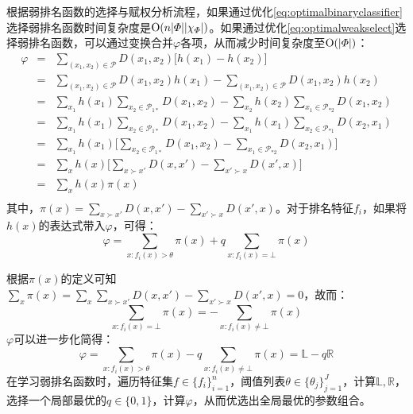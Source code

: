 根据弱排名函数的选择与赋权分析流程，如果通过优化\eqref{eq:optimalbinaryclassifier}选择弱排名函数时间复杂度是$\operatorname{\mathrm{O}}(n|\varPhi||\chi_{\varPhi}|)$。如果通过优化\eqref{eq:optimalweakselect}选择弱排名函数，可以通过变换合并$\varphi$各项，从而减少时间复杂度至$\operatorname{\mathrm{O}}(|\varPhi|)$：
\begin{equation}
    \begin{array}{lllc}
      \varphi & = & \sum\limits_{(x_1,x_2)\in \mathscr P} D(x_1,x_2) \big[h(x_1) - h(x_2)\big] \\
       & = & \sum\limits_{(x_1,x_2)\in \mathscr P} D(x_1,x_2) h(x_1) - \sum\limits_{(x_1,x_2)\in \mathscr P} D(x_1,x_2) h(x_2) \\
       & = & \sum\limits_{x_1} h(x_1) \sum\limits_{x_2\in \mathscr P_{1*}} D(x_1,x_2) -  \sum\limits_{x_2} h(x_2) \sum\limits_{x_1\in \mathscr P_{*2}} D(x_1,x_2) \\
       & = & \sum\limits_{x_1} h(x_1) \sum\limits_{x_2\in \mathscr P_{1*}} D(x_1,x_2) -  \sum\limits_{x_1} h(x_1) \sum\limits_{x_2\in \mathscr P_{*1}} D(x_2,x_1) \\
       & = & \sum\limits_{x_1} h(x_1) \big[\sum\limits_{x_2\in \mathscr P_{1*}} D(x_1,x_2) - \sum\limits_{x_1\in \mathscr P_{*2}} D(x_2,x_1)\big]\\
       & = & \sum\limits_{x} h(x) \big[\sum\limits_{x\succ x'} D(x,x') - \sum\limits_{x'\succ x} D(x',x)\big]\\
       & = & \sum\limits_{x} h(x) \pi(x)\\
    \end{array}
\end{equation}
其中，$\pi(x) = \sum\limits_{x\succ x'} D(x,x') - \sum\limits_{x'\succ x} D(x',x)$。对于排名特征$f_i$，如果将$h(x)$的表达式带入$\varphi$，可得：
\begin{equation}
    \varphi = \sum\limits_{x:f_i(x)> \theta} \pi(x) + q \sum\limits_{x:f_i(x)= \bot} \pi(x)
\end{equation}

根据$\pi(x)$的定义可知$\sum\limits_{x} \pi(x) = \sum\limits_{x} \sum\limits_{x\succ x'} D(x,x') - \sum\limits_{x'\succ x} D(x',x) = 0$，故而：
\begin{equation}
    \sum\limits_{x:f_i(x)= \bot} \pi(x) = - \sum\limits_{x:f_i(x)\ne \bot} \pi(x)
\end{equation}
$\varphi$可以进一步化简得：
\begin{equation}
    \varphi = \sum\limits_{x:f_i(x)> \theta} \pi(x) - q \sum\limits_{x:f_i(x)\ne \bot} \pi(x) = \mathbb{L} - q\mathbb{R}
\end{equation}
在学习弱排名函数时，遍历特征集$f \in\{f_i\}_{i=1}^n$，阈值列表$\theta\in\{\theta_j\}_{j=1}^J$，计算$\mathbb{L},\mathbb{R}$，选择一个局部最优的$q\in\{0,1\}$，计算$\varphi$，从而优选出全局最优的参数组合。

